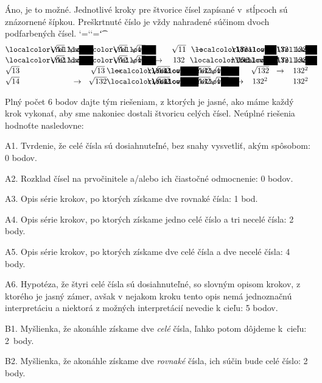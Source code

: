 {%
Áno, je to možné. Jednotlivé kroky pre štvorice čísel zapísané v~stĺpcoch sú znázornené šípkou.
Preškrtnuté číslo je vždy nahradené súčinom dvoch podfarbených čísel.
\def\cancel#1#2{\setbox0=\hbox{#2}%
    \dimen0=\wd0 \dimen1=\ht0 \advance\dimen1 by\dp0
    \hbox{\rlap{#2}\vbox to0pt{\kern\dp0 \csname cancel:\string#1\endcsname \vss}\kern\wd0}%
}
{\lccode`\?=`\p \lccode`\!=`\t \lowercase{\gdef\ignorept#1?!{#1}}}
\def\cancelB#1{\expandafter\ignorept\the\dimen#1 }
\sdef{cancel:/}{\pdfliteral{q 1 w 1 J \cancelcolor\space 0 0 m \cancelB0 \cancelB1 l S Q}}
\def\cancelcolor{0 0 1 RG}
\def\podfarbi#1{\setbox0=\hbox{#1}\leavevmode
{\localcolor\rlap{\Yellow\strut\vrule width\wd0}\box0}}
\let\g=\podfarbi
\def\ra{\rightarrow}
\def\c#1{\cancel /{$#1$}}
$$
\vbox
{\halign{#&&\hbox to 26pt{\hss#\unskip\hss}\cr
     \g{$\sqrt{11}$} & & \g{$\sqrt{11}$} & & $\sqrt{11}$ & & $\c{\sqrt{11}}$ & $\ra $ & \g{$132$} & & \g{$132$} & & $132$ \cr
     \g{$\sqrt{12}$} & & \g{$\sqrt{12}$} & & $\c{\sqrt{12}}$ & $\ra$ & $132$ & & \g{ $132$} & & \g{$132$} & & $132$ \cr
     $\sqrt{13}$ & & $\c{\sqrt{13}}$ & $\ra$ & \g{$\sqrt{132}$} & & \g{$\sqrt{132}$} & & $\sqrt{132}$ & & $\c{\sqrt{132}}$ & $\ra$ & $132^2$ \cr
     $\c{\sqrt{14}}$ & $\ra$ & $\sqrt{132}$ & & \g{$\sqrt{132}$} & & \g{$\sqrt{132}$} & & $\c{\sqrt{132}}$ & $\ra$ & $132^2$ & & $132^2$ \cr
}}
$$

\schemaABC
Plný počet 6 bodov dajte tým riešeniam,
z ktorých je jasné, ako máme každý krok vykonať,
aby sme nakoniec dostali štvoricu celých čísel.
Neúplné riešenia hodnoťte nasledovne:

\smallskip
\item{A1.} Tvrdenie, že celé čísla sú dosiahnuteľné, bez snahy vysvetliť, akým spôsobom: 0 bodov.
\item{A2.} Rozklad čísel na prvočinitele a/alebo ich čiastočné odmocnenie: 0 bodov.
\item{A3.} Opis série krokov, po ktorých získame dve rovnaké čísla: 1 bod.
\item{A4.} Opis série krokov, po ktorých získame jedno celé číslo a tri necelé čísla: 2 body.
\item{A5.} Opis série krokov, po ktorých získame dve celé čísla a dve necelé čísla: 4 body.
\item{A6.} Hypotéza, že štyri celé čísla sú dosiahnuteľné, so slovným opisom krokov, z ktorého je jasný zámer, avšak v nejakom kroku tento opis nemá jednoznačnú interpretáciu a niektorá z možných interpretácií nevedie k cieľu: 5 bodov.
\item{B1.} Myšlienka, že akonáhle získame dve \emph{celé} čísla, ľahko potom dôjdeme k~cieľu: 2~body.
\item{B2.} Myšlienka, že akonáhle získame dve \emph{rovnaké} čísla, ich súčin bude celé číslo: 2 body.

}
